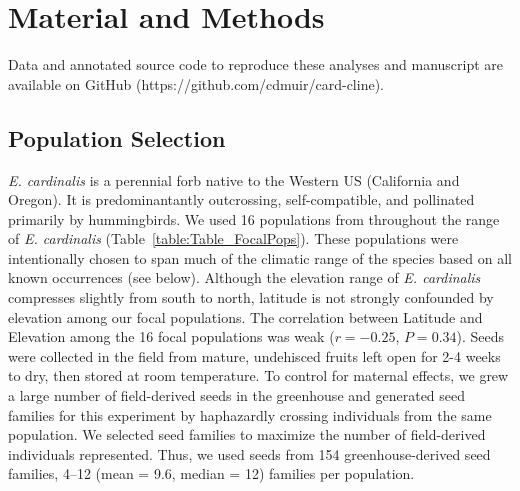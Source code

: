 \documentclass[11pt, oneside]{article}
\begin{document}
\section*{Material and Methods}

Data and annotated source code to reproduce these analyses and manuscript are available on GitHub (https://github.com/cdmuir/card-cline).


\subsection*{Population Selection}


\textit{E. cardinalis} is a perennial forb native to the Western US (California and Oregon). It is predominantantly outcrossing, self-compatible, and pollinated primarily by hummingbirds. We used 16 populations from throughout the range of \textit{E. cardinalis} (Table~\ref{table:Table_FocalPops}). These populations were intentionally chosen to span much of the climatic range of the species based on all known occurrences (see below). Although the elevation range of \textit{E. cardinalis} compresses slightly from south to north, latitude is not strongly confounded by elevation among our focal populations. The correlation between Latitude and Elevation among the 16 focal populations was weak ($r = -0.25$, $P = 0.34$). Seeds were collected in the field from mature, undehisced fruits left open for 2-4 weeks to dry, then stored at room temperature. To control for maternal effects, we grew a large number of field-derived seeds in the greenhouse and generated seed families for this experiment by haphazardly crossing individuals from the same population. We selected seed families to maximize the number of field-derived individuals represented. Thus, we used seeds from 154 greenhouse-derived seed families, 4--12 (mean = 9.6, median = 12) families per population. 

\end{document}

